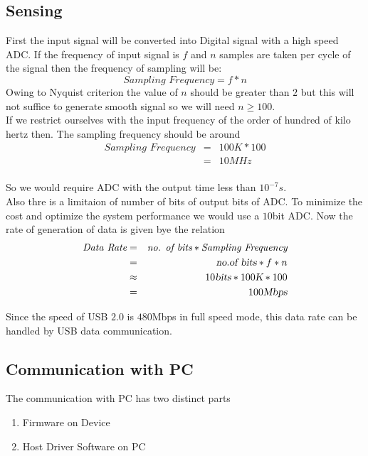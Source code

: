 \documentclass[12pt,a4paper]{article}
\begin{document}
\subsection{Sensing}
First the input signal will be converted into Digital signal with a high speed ADC. If the frequency of input signal is $f$ and $n$ samples are taken per cycle of the signal then the frequency of sampling will be:
\begin{equation}
	\textit{Sampling Frequency}= f*n
\end{equation}
Owing to Nyquist criterion the value of $n$  should be greater than $2$ but this will not suffice to generate smooth signal so we will need $n\geq 100$.\\

If we restrict ourselves with the input frequency of the order of hundred of kilo hertz then. The sampling frequency should be around
\begin{eqnarray*}
 \textit{Sampling Frequency}&=&100K*100\\
 &=& 10MHz\\
\end{eqnarray*}

So we would require ADC with the output time less than $10^{-7}s$. \\

Also thre is a limitaion of number of bits of output bits of ADC. To minimize the cost and optimize the system performance we would use a $10$bit ADC. Now the rate of generation of data is given bye the relation \\
\begin{eqnarray*}
\textit{Data Rate}&=&\textit{no. of bits}*\textit{Sampling Frequency}\\
&=& \textsl{no.of bits}*f*n\\
& \approx &10\textsl{bits}*100\textsl{K}*100\\
&=&100\textsl{Mbps}
\end{eqnarray*}

Since the speed of USB $2.0$ is $480$Mbps in full speed mode, this data rate can be handled by USB data communication.\\



\subsection{Communication with PC}
The communication with PC has two distinct parts
\begin{enumerate}
	\item Firmware on Device
	\item Host Driver Software on PC
\end{enumerate}
\end{document}
